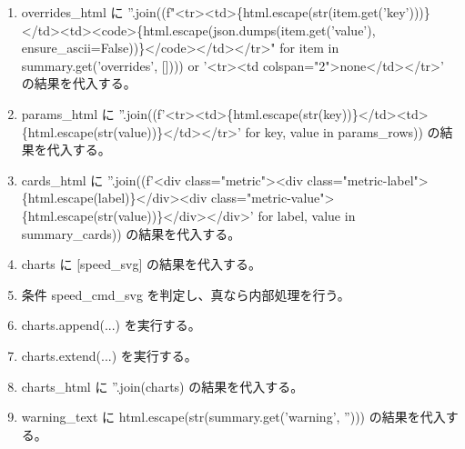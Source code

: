 \documentclass[a4paper,11pt]{article}
\begin{document}
\begin{enumerate}[leftmargin=1.8em]
\item overrides\_html に ''.join((f"<tr><td>\{html.escape(str(item.get('key')))\}</td><td><code>\{html.escape(json.dumps(item.get('value'), ensure\_ascii=False))\}</code></td></tr>" for item in summary.get('overrides', []))) or '<tr><td colspan="2">none</td></tr>' の結果を代入する。
\item params\_html に ''.join((f'<tr><td>\{html.escape(str(key))\}</td><td>\{html.escape(str(value))\}</td></tr>' for key, value in params\_rows)) の結果を代入する。
\item cards\_html に ''.join((f'<div class="metric"><div class="metric-label">\{html.escape(label)\}</div><div class="metric-value">\{html.escape(str(value))\}</div></div>' for label, value in summary\_cards)) の結果を代入する。
\item charts に [speed\_svg] の結果を代入する。
\item 条件 speed\_cmd\_svg を判定し、真なら内部処理を行う。
\item   charts.append(...) を実行する。
\item charts.extend(...) を実行する。
\item charts\_html に ''.join(charts) の結果を代入する。
\item warning\_text に html.escape(str(summary.get('warning', ''))) の結果を代入する。

\end{enumerate}
\end{document}
